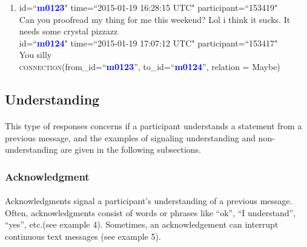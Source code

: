 \documentclass{article}
\begin{document}
\begin{enumerate}[resume]
\item id=``\textbf{\textcolor{blue}{m0123}}" time=``2015-01-19 16:28:15 UTC" participant=``153419"\\
Can you proofread my thing for me this weekend? Lol i think it sucks. It needs some crystal pizzazz \\
id=``\textbf{\textcolor{blue}{m0124}}" time=``2015-01-19 17:07:12 UTC" participant=``153417"\\
You silly\\
\textsc{connection}(from\_id=``\textbf{\textcolor{blue}{m0123}}'', to\_id=``\textbf{\textcolor{blue}{m0124}}'', relation = Maybe)\\
\end{enumerate}

\subsection{Understanding}
\paragraph{}
This type of responses concerns if a participant understands a statement from a previous message, and the examples of signaling understanding and non-understanding are given in the following subsections.

\subsubsection{Acknowledgment}
\paragraph{}
Acknowledgments signal a participant's understanding of a previous message. Often, acknowledgments consist of words or phrases like ``ok'', ``I understand'', ``yes'', etc.(see example 4). Sometimes, an acknowledgement can interrupt continuous text messages (see example 5). 
\end{document}
